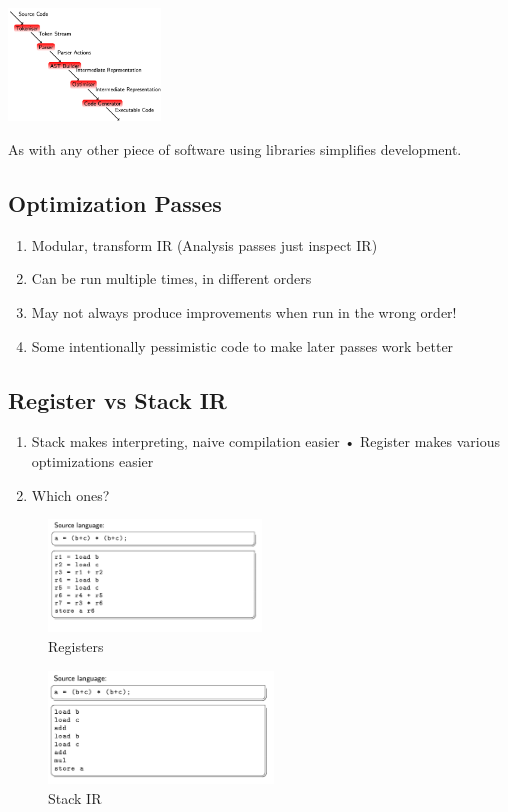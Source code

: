 \documentclass[a4paper]{exam}
\theoremstyle{definition}
\begin{document}
\begin{center}
  \includegraphics[height=3cm]{img/llvm.png}
\end{center}

As with any other piece of software using libraries simplifies development.

\subsection{Optimization Passes}
\begin{enumerate}
  \item  Modular, transform IR (Analysis passes just inspect IR)
  \item Can be run multiple times, in different orders
  \item May not always produce improvements when run in the wrong order!
  \item Some intentionally pessimistic code to make later passes work better
\end{enumerate}

\subsection{Register vs Stack IR}
\begin{enumerate}
  \item Stack makes interpreting, naive compilation easier • Register makes various optimizations easier
  \item Which ones?
\end{enumerate}
  \begin{figure}[h]
    \centering
    \includegraphics[height=3cm]{img/Snipaste_2021-04-05_17-25-13.png}
    \caption{Registers}
  \end{figure}

  \begin{figure}[h]
    \centering
    \includegraphics[height=3cm]{img/source_example.png}
    \caption{Stack IR}
  \end{figure}
\end{document}
